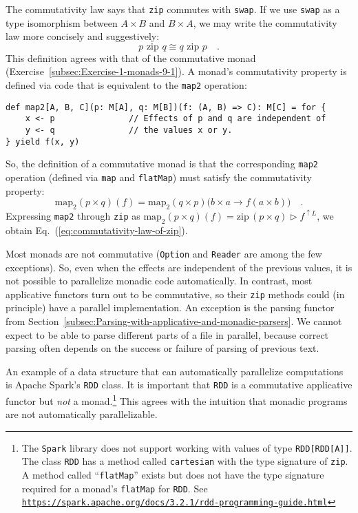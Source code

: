 The commutativity law says that \lstinline!zip! commutes with \lstinline!swap!.
If we use \lstinline!swap! as a type isomorphism between $A\times B$
and $B\times A$, we may write the commutativity law more concisely
and suggestively:
\[
p\,\,\text{zip}\,\,q\cong q\,\,\text{zip}\,\,p\quad.
\]
This definition agrees with that of the commutative monad
(Exercise~\ref{subsec:Exercise-1-monads-9-1}). A monad\textsf{'}s commutativity
property is defined via code that is equivalent to the \lstinline!map2!
operation:\texttt{\textcolor{blue}{\footnotesize{}}}
\begin{lstlisting}
def map2[A, B, C](p: M[A], q: M[B])(f: (A, B) => C): M[C] = for {
    x <- p               // Effects of p and q are independent of
    y <- q               // the values x or y.
} yield f(x, y)
\end{lstlisting}
 So, the definition of a commutative monad is that the corresponding
\lstinline!map2! operation (defined via \lstinline!map! and \lstinline!flatMap!)
must satisfy the commutativity property: 
\[
\text{map}_{2}(p\times q)(f)=\text{map}_{2}(q\times p)\big(b\times a\rightarrow f(a\times b)\big)\quad.
\]
Expressing \lstinline!map2! through \lstinline!zip! as $\text{map}_{2}(p\times q)(f)=\text{zip}\,(p\times q)\triangleright f^{\uparrow L}$,
we obtain Eq.~(\ref{eq:commutativity-law-of-zip}).

Most monads are not commutative (\lstinline!Option! and \lstinline!Reader!
are among the few exceptions). So, even when the effects are independent
of the previous values, it is not possible to parallelize monadic
code automatically. In contrast, most applicative functors turn out
to be commutative, so their \lstinline!zip! methods could (in principle)
have a parallel implementation. An exception is the parsing functor
from Section~\ref{subsec:Parsing-with-applicative-and-monadic-parsers}.
We cannot expect to be able to parse different parts of a file in
parallel, because correct parsing often depends on the success or
failure of parsing of previous text.

An example of a data structure that can automatically parallelize
computations is Apache Spark\textsf{'}s \lstinline!RDD! class.
It is important that \lstinline!RDD! is a commutative applicative
functor but \emph{not} a monad.\footnote{The \texttt{Spark} library does not support working with values of
type \lstinline!RDD[RDD[A]]!. The class \lstinline!RDD! has a method
called \lstinline!cartesian! with the type signature of \lstinline!zip!.
A method called \textsf{``}\lstinline!flatMap!\textsf{''} exists but does not have
the type signature required for a monad\textsf{'}s \lstinline!flatMap! for
\lstinline!RDD!. See \texttt{\href{https://spark.apache.org/docs/3.2.1/rdd-programming-guide.html}{https://spark.apache.org/docs/3.2.1/rdd-programming-guide.html}}} This agrees with the intuition that monadic programs are not automatically
parallelizable.


